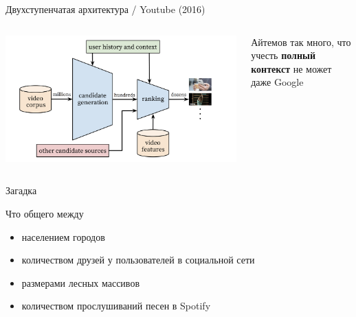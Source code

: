 \documentclass[11pt,aspectratio=169]{beamer}
\begin{document}
\begin{frame}{Двухступенчатая архитектура / Youtube (2016) \cite{YTBE}}
\begin{columns}
\begin{column}{0.6\textwidth}
   \begin{center}
		\includegraphics[scale=0.25]{images/youtube.png}
   \end{center}
\end{column}
\begin{column}{0.3\textwidth}
    \begin{tcolorbox}[colback=info!5,colframe=info!80,title=]
    Айтемов так много, что учесть {\bf полный контекст} не может даже Google
    \end{tcolorbox}
\end{column}
\end{columns}

\end{frame}

\begin{frame}{Загадка}

Что общего между
\begin{itemize}
\item населением городов
\item количеством друзей у пользователей в социальной сети
\item размерами лесных массивов
\item количеством прослушиваний песен в Spotify
\end{itemize}

\end{frame}
\end{document}
